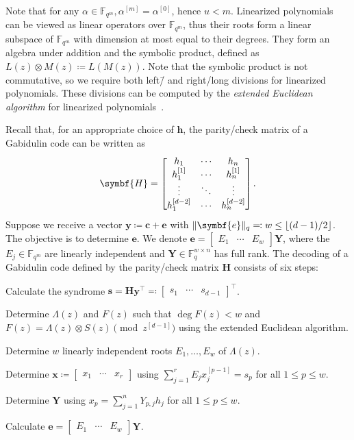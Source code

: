 \documentclass[version=last, paper=A4, parskip=half, oneside,%
toc=bibliography, toc=listof, listof=leveldown]{scrbook}
\theoremstyle{plain}
\theoremstyle{definition}
\theoremstyle{remark}
\renewcommand*{\vec}{\symbf}
\newcommand*{\mat}{\symbf}
\newcommand*{\trans}{\top}%
\newcommand*{\FF}{\ensuremath{\mathbb{F}}}
\DeclarePairedDelimiter{\floor}{\lfloor}{\rfloor}
\DeclarePairedDelimiter{\norm}{\lVert}{\rVert}
\newcommand*{\normR}[2]{\ensuremath{\norm{#1}_{#2}}}
\begin{document}
Note that for any \(\alpha \in \FF_{q^m}, \alpha^{[m]} = \alpha^{[0]}\), hence
\(u < m\).  Linearized polynomials can be viewed as linear operators over
\(\FF_{q^m}\), thus their roots form a linear subspace of \(\FF_{q^m}\) with
dimension at most equal to their degrees.  They form an algebra under addition
and the symbolic product, defined as \(L(z) \otimes M(z) \coloneqq L(M(z))\).
Note that the symbolic product is not commutative, so we require both left\=/{}
and right\-/long divisions for linearized polynomials.  These divisions can be
computed by the \emph{extended Euclidean algorithm} for linearized
polynomials~\cite{WSB10}.

Recall that, for an appropriate choice of \(\vec{h}\), the parity\-/check matrix
of a Gabidulin code can be written as
\[
  \mat{H} =
  \begin{bmatrix}
    h_1 & \cdots & h_n \\
    h_1^{[1]} & \cdots & h_n^{[1]} \\
    \vdots & \ddots & \vdots \\
    h_1^{[d - 2]} & \cdots & h_n^{[d - 2]}
  \end{bmatrix}\text.
\]
Suppose we receive a vector \(\vec{y} \coloneqq \vec{c} + \vec{e}\) with
\(\normR{\vec{e}}{q} \eqqcolon w \le \floor{(d - 1) / {2}}\).  The objective is
to determine \(\vec{e}\).  We denote
\(\vec{e} = \begin{bmatrix} E_1 & \cdots & E_w \end{bmatrix}\mat{Y}\), where the
\(E_j \in \FF_{q^m}\) are linearly independent and
\(\mat{Y} \in \FF_q^{w \times n}\) has full rank.  The decoding of a Gabidulin
code defined by the parity\-/check matrix \(\mat{H}\) consists of six steps:
\begin{steps}
\item\label{stp:GC-decoding-1} Calculate the syndrome
  \(\vec{s} = \mat{H} \vec{y}^{\trans} \eqqcolon
  \begin{bmatrix} s_1 & \cdots & s_{d - 1} \end{bmatrix}^{\trans}\).
\item\label{stp:GC-decoding-2} Determine \(\Lambda(z)\) and \(F(z)\) such that
  \(\deg F(z) < w\) and \(F(z) = \Lambda(z) \otimes S(z) \pmod{z^{[d - 1]}}\)
  using the extended Euclidean algorithm.
\item\label{stp:GC-decoding-3} Determine \(w\) linearly independent roots
  \(E_1, \ldots, E_w\) of \(\Lambda(z)\).
\item\label{stp:GC-decoding-4} Determine
  \(\vec{x} \coloneqq \begin{bmatrix} x_1 & \cdots & x_r \end{bmatrix}\) using
  \(\sum_{j = 1}^r E_j x_j^{[p - 1]} = s_p\) for all \(1 \le p \le w\).
\item\label{stp:GC-decoding-5} Determine \(\mat{Y}\) using
  \(x_p = \sum_{j = 1}^n Y_{p, j} h_j\) for all \(1 \le p \le w\).
\item\label{stp:GC-decoding-6} Calculate
  \(\vec{e} = \begin{bmatrix} E_1 & \cdots & E_w \end{bmatrix} \mat{Y}\).
\end{steps}
\end{document}
